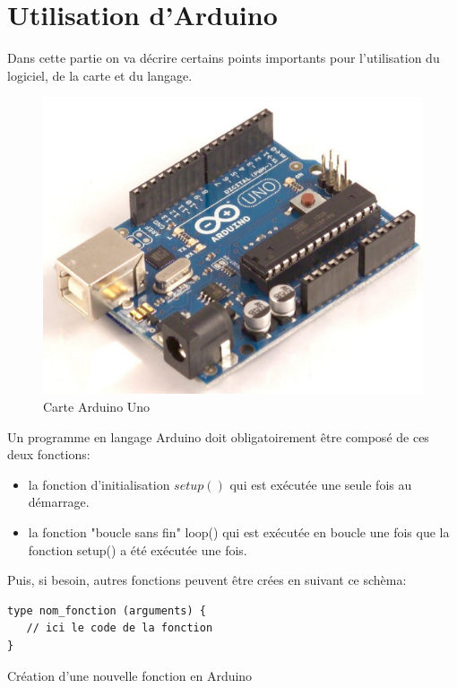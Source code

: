 \section{Utilisation d'Arduino}

  Dans cette partie on va décrire certains points importants pour l'utilisation du logiciel, de la carte et du langage.

\begin{figure}[h]
\begin{center}
 \includegraphics[scale=0.4]{figure/Arduino/arduinoUno.png}
\caption{Carte Arduino Uno}
\end{center}
\end{figure}

Un programme en langage Arduino doit obligatoirement être composé de ces deux fonctions:
\begin{itemize}
 \item la fonction d'initialisation $setup()$ qui est exécutée une seule fois au démarrage.
 \item la fonction "boucle sans fin" loop() qui est exécutée en boucle une fois que la fonction setup() a été exécutée une fois. 
\end{itemize}

Puis, si besoin, autres fonctions peuvent être crées en suivant ce schèma:   
\begin{table}[h]
\begin{lstlisting}
type nom_fonction (arguments) {
   // ici le code de la fonction
}
\end{lstlisting}
\caption{Création d'une nouvelle fonction en Arduino}
\end{table}


